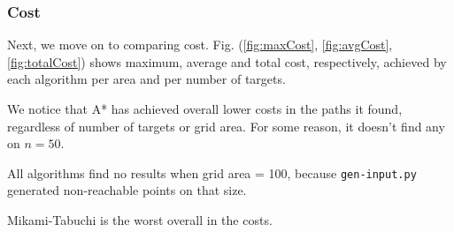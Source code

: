 \subsubsection{Cost}
Next, we move on to comparing cost. Fig. (\ref{fig:maxCost}, \ref{fig:avgCost}, \ref{fig:totalCost}) shows maximum, average and total cost, respectively, achieved by each algorithm per area and per number of targets.

We notice that A* has achieved overall lower costs in the paths it found, regardless of number of targets or grid area. For some reason, it doesn't find any on $n=50$. 

All algorithms find no results when grid area = 100, because \texttt{gen-input.py} generated non-reachable points on that size.

Mikami-Tabuchi is the worst overall in the costs.

